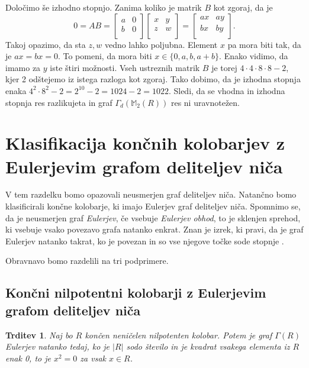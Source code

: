 \documentclass[a4paper, 12pt]{amsart}
\theoremstyle{definition} %
\theoremstyle{plain} %
\newtheorem{trditev}[definicija]{Trditev}
\newcommand{\M}{\mathbb M}
\begin{document}
Določimo še izhodno stopnjo. Zanima koliko je matrik $B$ kot zgoraj, da je 
$$
0 = AB = \begin{bmatrix}
a & 0 \\
b & 0 \\
\end{bmatrix}
\begin{bmatrix}
x & y \\
z & w \\
\end{bmatrix}
=
\begin{bmatrix}
ax & ay \\
bx & by \\
\end{bmatrix}.
$$
Takoj opazimo, da sta $z,w$ vedno lahko poljubna. Element $x$ pa mora biti tak, da je $ax = bx = 0$. To pomeni, da mora biti $x\in \{0,a,b,a+b\}$. Enako vidimo, da imamo za $y$ iste štiri možnosti. Vseh ustreznih matrik $B$ je torej $4\cdot 4 \cdot 8 \cdot 8 -2$, kjer 2 odštejemo iz istega razloga kot zgoraj. Tako dobimo, da je izhodna stopnja enaka $4^2 \cdot 8^2 - 2 = 2^{10}-2 = 1024-2 = 1022$. Sledi, da se vhodna in izhodna stopnja res razlikujeta in graf $\Gamma_d(\M_2(R))$ res ni uravnotežen.
\endproof

\section{Klasifikacija končnih kolobarjev z Eulerjevim grafom deliteljev niča}
V tem razdelku bomo opazovali neusmerjen graf deliteljev niča. Natančno bomo klasificirali končne kolobarje, ki imajo Eulerjev graf deliteljev niča.
Spomnimo se, da je neusmerjen graf \emph{Eulerjev}, če vsebuje \emph{Eulerjev obhod}, to je sklenjen sprehod, ki vsebuje vsako povezavo grafa natanko enkrat. Znan je izrek, ki pravi, da je graf Eulerjev natanko takrat, ko je povezan in so vse njegove točke sode stopnje \cite[Theorem 1.8.1]{Diestel}.

 Obravnavo bomo razdelili na tri podprimere.

\subsection{Končni nilpotentni kolobarji z Eulerjevim grafom deliteljev niča}

\begin{trditev}
\label{EulerNilpotenten}
Naj bo $R$ končen neničelen nilpotenten kolobar. Potem je graf $\Gamma(R)$ Eulerjev natanko tedaj, ko je $|R|$ sodo število in je kvadrat vsakega elementa iz $R$ enak 0, to je $x^2=0$ za vsak $x\in R$.
\end{trditev}
\end{document}
